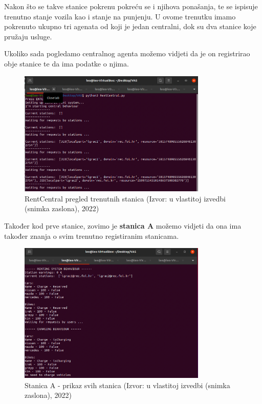 \documentclass{foi}
\begin{document}
Nakon što se takve stanice pokrenu pokreću se i njihova ponašanja, te se ispisuje trenutno stanje vozila kao i stanje na punjenju. U ovome trenutku imamo pokrenuto ukupno tri agenata od koji je jedan centralni, dok su dva stanice koje pružaju usluge. 

Ukoliko sada pogledamo centralnog agenta možemo vidjeti da je on registrirao obje stanice te da ima podatke o njima. 

\begin{figure}[H]
	\centering
	\includegraphics[width=0.8\textwidth]{slike/vas4}
	\caption{RentCentral pregled trenutnih stanica (Izvor: u vlastitoj izvedbi (snimka zaslona), 2022)}
\end{figure}

Također kod prve stanice, zovimo je \textbf{stanica A} možemo vidjeti da ona ima također znanja o svim trenutno registiranim stanicama.

\begin{figure}[H]
	\centering
	\includegraphics[width=0.8\textwidth]{slike/vas5}
	\caption{Stanica A - prikaz svih stanica (Izvor: u vlastitoj izvedbi (snimka zaslona), 2022)}
\end{figure}
\end{document}
